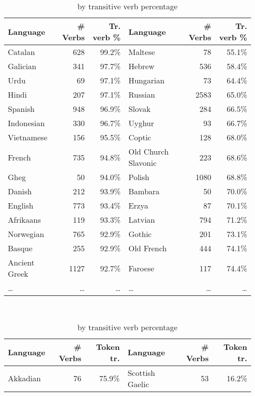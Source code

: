 \begin{table}[ht]
    \centering
    \small
    \begin{subtable}[c]{\textwidth}
      \centering
      \begin{tabular}{lrr|lrr}
        \toprule
        Language & \# Verbs & Tr. verb \% & Language & \# Verbs & Tr. verb \% \\
        \midrule
        Catalan & 628 & 99.2\% & Maltese & 78 & 55.1\% \\
        Galician & 341 & 97.7\% & Hebrew & 536 & 58.4\% \\
        Urdu & 69 & 97.1\% & Hungarian & 73 & 64.4\% \\
        Hindi & 207 & 97.1\% & Russian & 2583 & 65.0\% \\
        Spanish & 948 & 96.9\% & Slovak & 284 & 66.5\% \\
        Indonesian & 330 & 96.7\% & Uyghur & 93 & 66.7\% \\
        Vietnamese & 156 & 95.5\% & Coptic & 128 & 68.0\% \\
        French & 735 & 94.8\% & Old Church Slavonic & 223 & 68.6\% \\
        Gheg & 50 & 94.0\% & Polish & 1080 & 68.8\% \\
        Danish & 212 & 93.9\% & Bambara & 50 & 70.0\% \\
        English & 773 & 93.4\% & Erzya & 87 & 70.1\% \\
        Afrikaans & 119 & 93.3\% & Latvian & 794 & 71.2\% \\
        Norwegian & 765 & 92.9\% & Gothic & 201 & 73.1\% \\
        Basque & 255 & 92.9\% & Old French & 444 & 74.1\% \\
        Ancient Greek & 1127 & 92.7\% & Faroese & 117 & 74.4\% \\
        \dots & \dots & \dots & \dots & \dots & \dots \\
        \bottomrule
      \end{tabular}
      \caption{by transitive verb percentage}
      \label{tab:most_tr_by_verb_percentage}
    \end{subtable}\\
    \begin{subtable}[c]{\textwidth}
      \centering
      \begin{tabular}{lrr|lrr}
        \toprule
        Language & \# Verbs & Token tr. & Language & \# Verbs & Token tr. \\
        \midrule
        Akkadian & 76 & 75.9\% & Scottish Gaelic & 53 & 16.2\% \\

\end{tabular}
\end{subtable}
\end{table}
